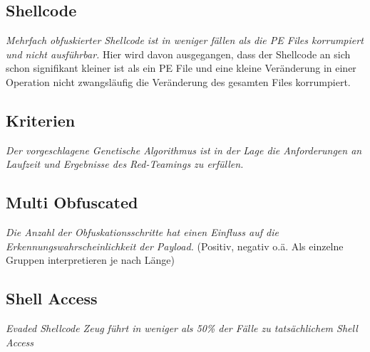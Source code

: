 \subsection{Shellcode}
\textit{Mehrfach obfuskierter Shellcode ist in weniger fällen als die PE Files korrumpiert und nicht ausführbar.}
Hier wird davon ausgegangen, dass der Shellcode an sich schon signifikant kleiner ist als ein PE File und eine kleine Veränderung in einer Operation nicht zwangsläufig die Veränderung des gesamten Files korrumpiert.
\subsection{Kriterien}
\label{Methode:Kriterien}
\textit{Der vorgeschlagene Genetische Algorithmus ist in der Lage die Anforderungen an Laufzeit und Ergebnisse des Red-Teamings zu erfüllen.}
\subsection{Multi Obfuscated}
\textit{Die Anzahl der Obfuskationsschritte hat einen Einfluss auf die Erkennungswahrscheinlichkeit der Payload.} (Positiv, negativ o.ä. Als einzelne Gruppen interpretieren je nach Länge)
\subsection{Shell Access}
\textit{Evaded Shellcode Zeug führt in weniger als 50\% der Fälle zu tatsächlichem Shell Access}



